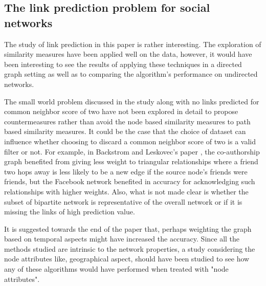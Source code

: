 \documentclass[11pt]{article}
\begin{document}
\subsection{The link prediction problem for social networks \cite{nowellklein}}
The study of link prediction in this paper is rather interesting. The exploration of similarity measures have been applied well on the data, however, it would have been interesting to see the results of applying these techniques in a directed graph setting as well as to comparing the algorithm's performance on undirected networks.\\
\par
The small world problem discussed in the study along with no links predicted for common neighbor score of two have not been explored in detail to propose countermeasures rather than avoid the node based similarity measures to path based similarity measures. It could be the case that the choice of dataset can influence whether choosing to discard a common neighbor score of two is a valid filter or not.  For example, in Backstrom and Leskovec's paper \cite{backstromjure}, the co-authorship graph benefited from giving less weight to triangular relationships where a friend two hops away is less likely to be a new edge if the source node's friends were friends, but the Facebook network benefited in accuracy for acknowledging such relationships with higher weights.  Also, what is not made clear is whether the subset of bipartite network is representative of the overall network or if it is missing the links of high prediction value.\\
\par
It is suggested towards the end of the paper that, perhaps weighting the graph based on temporal aspects might have increased the accuracy. Since all the methods studied are intrinsic to the network properties, a study considering the node attributes like, geographical aspect, should have been studied to see how any of these algorithms would have performed when treated with "node attributes".
\end{document}
